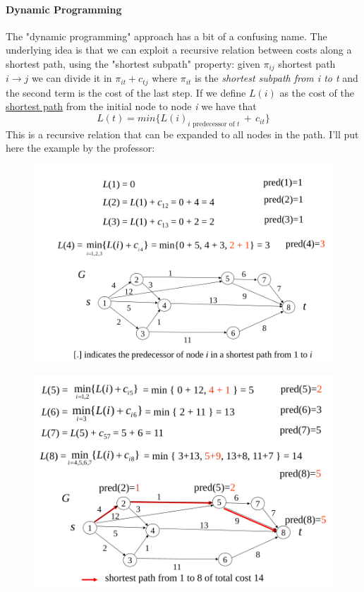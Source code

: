 \documentclass{article}
\begin{document}
				\paragraph{Dynamic Programming}
					The "dynamic programming" approach has a bit of a confusing name. The underlying idea is that we can exploit a recursive relation between costs along a shortest path, using the "shortest subpath" property: given $\pi_{ij}$ shortest path $i \rightarrow j$ we can divide it in $\pi_{it} + c_{tj}$ where $\pi_{it}$ is the \textit{shortest subpath from i to t} and the second term is the cost of the last step. If we define $L(i)$ as the cost of the \underline{shortest path} from the initial node to node \emph{i} we have that
					\begin{equation}
						L(t) = min\{ L(i)_{i \text{ predecessor of } t}\, +\, c_{it} \}
					\end{equation}
					This is a recursive relation that can be expanded to all nodes in the path. I'll put here the example by the professor:
					\begin{figure}[H]
						\centering
						\includegraphics[width = \textwidth]{./images/DynProg.png}
					\end{figure}
					\begin{figure}[H]
						\centering
						\includegraphics[width = \textwidth]{./images/DynProg2.png}
					\end{figure}
\end{document}
